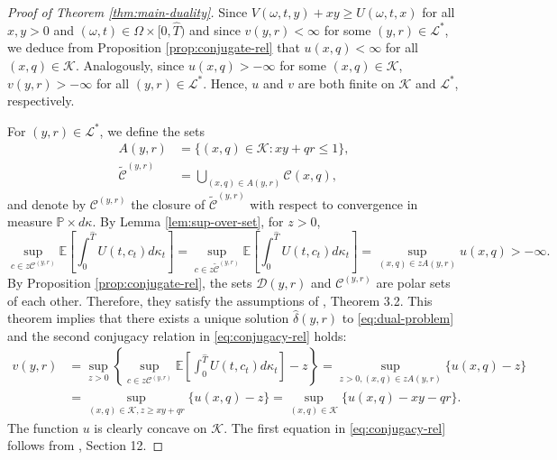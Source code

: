 \documentclass[11pt, oneside]{article}   	%
\theoremstyle{plain}
\theoremstyle{definition}
\theoremstyle{remark}
\begin{document}
\begin{proof}[Proof of Theorem \ref{thm:main-duality}]
Since $V(\omega,t,y)+xy\geq U(\omega,t,x)$ for all $x,y>0$ and $(\omega,t)\in\Omega\times[0,\hat{T})$ and since $v(y,r)<\infty$ for some $(y,r)\in\mathcal{L}^*$, we deduce from Proposition \ref{prop:conjugate-rel} that $u(x,q)<\infty$ for all $(x,q)\in\mathcal{K}$. Analogously, since $u(x,q)>-\infty$ for some $(x,q)\in\mathcal{K}$, $v(y,r)>-\infty$ for all $(y,r)\in\mathcal{L}^*$. Hence, $u$ and $v$ are both finite on $\mathcal{K}$ and $\mathcal{L}^*$, respectively.

For $(y,r)\in\mathcal{L}^*$, we define the sets
\begin{equation*}
\begin{aligned}
A(y,r)&=\{(x,q)\in\mathcal{K}: xy+qr\leq 1\},\\
\tilde{\mathcal{C}}^{(y,r)}&=\bigcup_{(x,q)\in A(y,r)}\mathcal{C}(x,q),
\end{aligned}
\end{equation*}
and denote by $\mathcal{C}^{(y,r)}$ the closure of $\tilde{\mathcal{C}}^{(y,r)}$ with respect to convergence in measure $\mathbb{P}\times d\kappa$. By Lemma \ref{lem:sup-over-set}, for $z>0$,
$$\sup_{c\in z\mathcal{C}^{(y,r)}}\mathbb{E}\left[\int_0^{\hat{T}} U(t,c_t)d\kappa_t\right]=\sup_{c\in z\tilde{\mathcal{C}}^{(y,r)}}\mathbb{E}\left[\int_0^{\hat{T}} U(t,c_t)d\kappa_t\right]=\sup_{(x,q)\in zA(y,r)} u(x,q)>-\infty.$$
By Proposition \ref{prop:conjugate-rel}, the sets $\mathcal{D}(y,r)$ and $\mathcal{C}^{(y,r)}$ are polar sets of each other. Therefore, they satisfy the assumptions of \cite{mostovyi}, Theorem 3.2. This theorem implies that there exists a unique solution $\hat{\delta}(y,r)$ to \eqref{eq:dual-problem} and the second conjugacy relation in \eqref{eq:conjugacy-rel} holds:
\begin{equation}\label{eq:1st-conj-rel}
\begin{aligned}
v(y,r)&=\sup_{z>0}\left\{\sup_{c\in z\mathcal{C}^{(y,r)}}\mathbb{E}\left[\int_0^{\hat{T}} U(t,c_t)d\kappa_t\right]-z\right\}=\sup_{z>0, (x,q)\in zA(y,r)}\{u(x,q)-z\}\\
&=\sup_{(x,q)\in\mathcal{K},z\geq xy+qr}\{u(x,q)-z\}=\sup_{(x,q)\in\mathcal{K}}\{u(x,q)-xy-qr\}.
\end{aligned}
\end{equation}
The function $u$ is clearly concave on $\mathcal{K}$. The first equation in \eqref{eq:conjugacy-rel} follows from \cite{rockafellar}, Section 12.


\end{proof}
\end{document}
